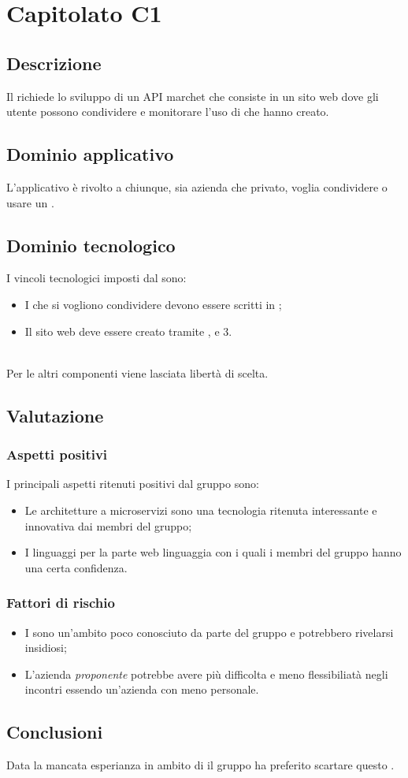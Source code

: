 \documentclass[../StudioDiFattibilita.tex]{subfiles}
\begin{document}
	\section{Capitolato C1}
		\subsection{Descrizione}
		Il  richiede lo sviluppo di un API marchet che consiste in un sito web dove gli utente possono condividere e monitorare l'uso di  che hanno creato.
		\subsection{Dominio applicativo}
		L'applicativo è rivolto a chiunque, sia azienda che privato, voglia condividere o usare un .
		\subsection{Dominio tecnologico} 
		I vincoli tecnologici imposti dal  sono:
				\begin{itemize}
			\item I  che si vogliono condividere devono essere scritti in ;
	\item	Il sito web deve essere creato tramite ,  e 3.
		\end{itemize}
		\\ Per le altri componenti viene lasciata libertà di scelta.
		\subsection{Valutazione}
			\subsubsection{Aspetti positivi}
			I principali aspetti ritenuti positivi dal gruppo sono:
				\begin{itemize}
				\item Le architetture a microservizi sono una tecnologia ritenuta interessante e innovativa dai membri del gruppo; 
				\item I linguaggi per la parte web linguaggia con i quali i membri del gruppo hanno una certa confidenza.
			\end{itemize}
			\subsubsection{Fattori di rischio}
				\begin{itemize}
				\item I  sono un'ambito poco conosciuto da parte del gruppo e potrebbero rivelarsi insidiosi;
				\item L'azienda \textit{proponente} potrebbe avere più difficolta e meno flessibiliatà negli incontri essendo un'azienda con meno personale.
			\end{itemize}
			\subsection{Conclusioni}
			Data la mancata esperianza in ambito di  il gruppo ha preferito scartare questo .
\end{document}
